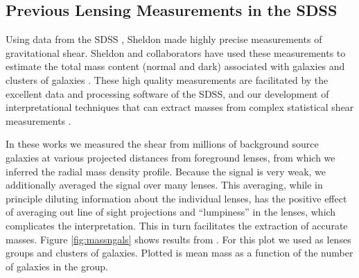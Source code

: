 \documentclass[12pt]{article}
\begin{document}
\subsection{Previous Lensing Measurements in the SDSS} \label{sec:sdssold}

Using data from the SDSS \cite{York00}, Sheldon made highly precise
measurements of gravitational shear. Sheldon and collaborators have used these
measurements to estimate the total mass content (normal and dark) associated
with galaxies and clusters of galaxies
\cite{fis00,Sheldon04,SheldonLensing07,JohnstonLensing07,SheldonM2L07}.  These
high quality measurements are facilitated by the excellent data and processing
software of the SDSS, and our development of interpretational techniques that
can extract masses from complex statistical shear measurements
\cite{JohnstonInvert07}.

In these works we measured the shear from millions of background source
galaxies at various projected distances from foreground lenses, from which we
inferred the radial mass density profile.  Because the signal is very weak, we
additionally averaged the signal over many lenses.  This averaging, while in
principle diluting information about the individual lenses, has the positive
effect of averaging out line of sight projections and ``lumpiness'' in the
lenses, which complicates the interpretation.  This in turn facilitates the
extraction of accurate masses.  Figure \ref{fig:massngals} shows results from
\cite{SheldonLensing07,JohnstonLensing07}. For this plot we used as lenses
groups and clusters of galaxies.  Plotted is mean mass as a function of the
number of galaxies in the group.  
\end{document}
